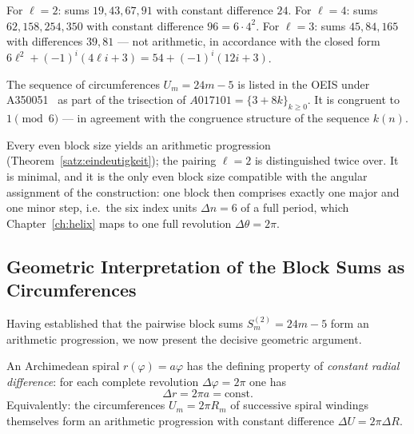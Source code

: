\begin{remark}
For $\ell = 2$: sums $19, 43, 67, 91$ with constant difference $24$.
For $\ell = 4$: sums $62, 158, 254, 350$ with constant difference
$96 = 6 \cdot 4^2$. For $\ell = 3$: sums $45, 84, 165$ with differences
$39, 81$ --- not arithmetic, in accordance with the closed form
$6\ell^2 + (-1)^i(4\ell i + 3) = 54 + (-1)^i(12i+3)$.
\end{remark}

\begin{remark}
	The sequence of circumferences $U_m = 24m - 5$ is listed in the OEIS
	under A350051~\cite{OEIS} as part of the trisection of
	$A017101 = \{3 + 8k\}_{k \geq 0}$. It is congruent to
	$1 \pmod{6}$ --- in agreement with the congruence structure
	of the sequence $k(n)$.
\end{remark}

\begin{remark}
Every even block size yields an arithmetic progression
(Theorem~\ref{satz:eindeutigkeit}); the pairing $\ell = 2$ is
distinguished twice over. It is minimal, and it is the only even block
size compatible with the angular assignment of the construction: one
block then comprises exactly one major and one minor step, i.e.\ the six
index units $\Delta n = 6$ of a full period, which Chapter~\ref{ch:helix}
maps to one full revolution $\Delta\theta = 2\pi$.
\end{remark}

\subsection{Geometric Interpretation of the Block Sums as Circumferences}
\label{subsec:geometrische_interpretation}

Having established that the pairwise block sums $S_m^{(2)} = 24m - 5$ form
an arithmetic progression, we now present the decisive geometric argument.

An Archimedean spiral $r(\varphi) = a\varphi$ has the defining
property of \emph{constant radial difference}: for each complete
revolution $\Delta\varphi = 2\pi$ one has
\[
  \Delta r = 2\pi a = \text{const}.
\]
Equivalently: the circumferences $U_m = 2\pi R_m$ of successive
spiral windings themselves form an arithmetic progression with constant
difference $\Delta U = 2\pi \Delta R$.
\clearpage

